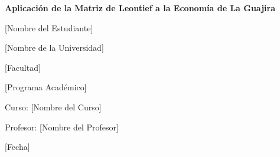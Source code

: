 \thispagestyle{empty}

\vspace*{3cm}

\begin{center}
    {\LARGE \textbf{Aplicación de la Matriz de Leontief a la Economía de La Guajira} \par}

    \vspace{3cm}

    {\large [Nombre del Estudiante] \par}

    \vspace{1cm}

    {\large [Nombre de la Universidad] \par}

    {\large [Facultad] \par}

    {\large [Programa Académico] \par}

    \vspace{2cm}

    {\large Curso: [Nombre del Curso] \par}

    \vspace{1cm}

    {\large Profesor: [Nombre del Profesor] \par}

    \vspace{2cm}

    {\large [Fecha] \par}

    \vfill
\end{center}

\clearpage
